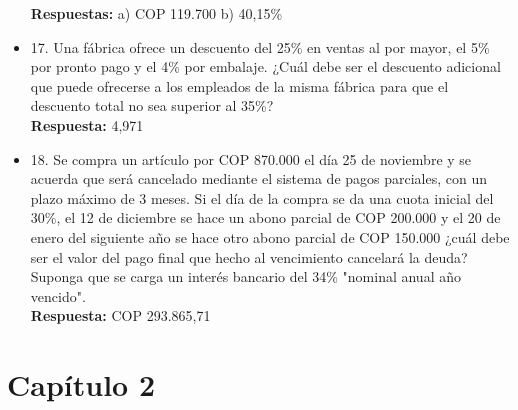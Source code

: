 \begin{itemize}
       \textbf{Respuestas:} a) COP 119.700 b) 40,15\%
       \medskip

 \item 17. Una fábrica ofrece un descuento del 25\% en ventas al por mayor, el 5\% por pronto pago y el 4\% por embalaje. ¿Cuál debe ser el descuento adicional que puede ofrecerse a los empleados de la misma fábrica para que el descuento total no sea superior al 35\%?\\
       \textbf{Respuesta:} 4,971%
       \medskip

 \item 18. Se compra un artículo por COP 870.000 el día 25 de noviembre y se acuerda que será cancelado mediante el sistema de pagos parciales, con un plazo máximo de 3 meses. Si el día de la compra se da una cuota inicial del 30\%, el 12 de diciembre se hace un abono parcial de COP 200.000 y el 20 de enero del siguiente año se hace otro abono parcial de COP 150.000 ¿cuál debe ser el valor del pago final que hecho al vencimiento cancelará la deuda? Suponga que se carga un interés bancario del 34\% "nominal anual año vencido".\\

       \textbf{Respuesta:} COP 293.865,71
       \medskip

\end{itemize}

\chapter*{Capítulo 2}


